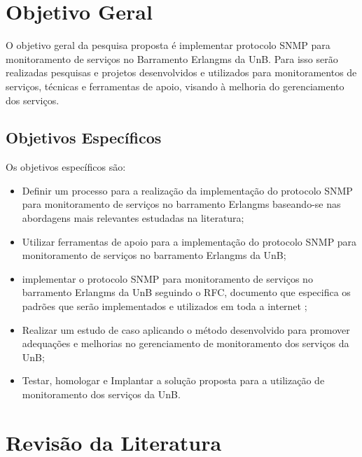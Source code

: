 \documentclass[qualidr]{eesc}
\begin{document}
\section{Objetivo Geral}

O objetivo geral da pesquisa proposta é implementar protocolo SNMP para monitoramento de serviços no Barramento Erlangms da UnB. Para isso serão realizadas  pesquisas e projetos desenvolvidos e utilizados para monitoramentos de serviços, técnicas e ferramentas de apoio, visando à melhoria do gerenciamento dos serviços.

\subsection{Objetivos Específicos}

Os objetivos específicos são:

\begin{itemize}
	 
\item Definir um processo para a realização da implementação do protocolo SNMP para monitoramento de serviços no barramento Erlangms baseando-se nas  abordagens mais relevantes estudadas na literatura;

\item Utilizar ferramentas de apoio para a implementação do protocolo SNMP para monitoramento de serviços no barramento Erlangms da UnB;

\item implementar o protocolo SNMP para monitoramento de serviços no barramento Erlangms da UnB seguindo o RFC\cite{Schoffstall}, documento que especifica os padrões que serão implementados e utilizados em toda a internet ;

\item Realizar um estudo de caso aplicando o método desenvolvido  para promover adequações e melhorias no gerenciamento de monitoramento dos serviços da UnB; 

\item Testar, homologar e Implantar a solução proposta para a utilização de monitoramento dos serviços da UnB. 

\end{itemize}

\section{Revisão da Literatura}
\end{document}
